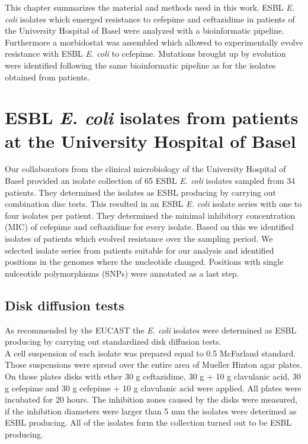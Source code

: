 This chapter summarizes the material and methods used in this work. ESBL \textit{E. coli} isolates which emerged resistance to cefepime and ceftazidime in patients of the University Hospital of Basel were analyzed with a bioinformatic pipeline. Furthermore a morbidostat was assembled which allowed to experimentally evolve resistance with ESBL \textit{E. coli} to cefepime. Mutations brought up by evolution were identified following the same bioinformatic pipeline as for the isolates obtained from patients.

\section{ESBL \textit{E. coli} isolates from patients at the University Hospital of Basel}
Our collaborators from the clinical microbiology of the University Hospital of Basel provided an isolate collection of 65 ESBL \textit{E. coli} isolates sampled from 34 patients. They determined the isolates as ESBL producing by carrying out combination disc tests. This resulted in an ESBL \textit{E. coli} isolate series with one to four isolates per patient. They determined the minimal inhibitory concentration (MIC) of cefepime and ceftazidime for every isolate. Based on this we identified isolates of patients which evolved resistance over the sampling period. We selected isolate series from patients suitable for our analysis and identified positions in the genomes where the nucleotide changed. Positions with single nulceotide polymorphisms (SNPs) were annotated as a last step. 
\label{section:sample_collection}

\subsection{Disk diffusion tests}
As recommended by the EUCAST the \textit{E. coli} isolates were determined as ESBL producing by carrying out standardized disk diffusion tests. \\
A cell suspension of each isolate was prepared equal to 0.5 McFarland standard. Those suspensions were spread over the entire area of Mueller Hinton agar plates. On those plates disks with ether 30 \textmu g ceftazidime, 30 \textmu g + 10 \textmu g clavulanic acid, 30 \textmu g cefepime and 30 \textmu g cefepime + 10 \textmu g clavulanic acid were applied. All plates were incubated for 20 hours. The inhibition zones caused by the disks were measured, if the inhibition diameters were larger than 5 mm the isolates were deterimed as ESBL producing. All of the isolates form the collection turned out to be ESBL producing. 

